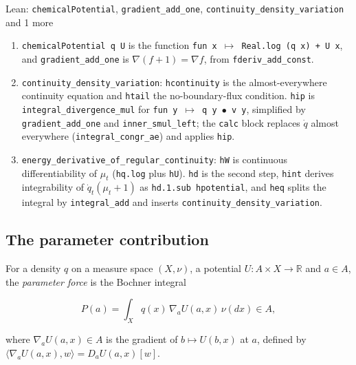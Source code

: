 \documentclass[11pt,a4paper]{report}
\begin{document}
\begin{leanbox}{Lean: \texttt{chemicalPotential}, \texttt{gradient\_\allowbreak{}add\_\allowbreak{}one}, \texttt{continuity\_\allowbreak{}density\_\allowbreak{}variation} and 1 more}
\begin{enumerate}
\item \texttt{chemical\allowbreak{}Potential q U} is the function \texttt{fun x \ensuremath{\mapsto} Real.\allowbreak{}log (q x) + U x}, and \texttt{gradient\_\allowbreak{}add\_\allowbreak{}one} is \(\nabla(f+1)=\nabla f\), from \texttt{fderiv\_\allowbreak{}add\_\allowbreak{}const}.

\item \texttt{continuity\_\allowbreak{}density\_\allowbreak{}variation}: \texttt{hcontinuity} is the almost-everywhere continuity equation and \texttt{htail} the no-boundary-flux condition. \texttt{hip} is \texttt{integral\_\allowbreak{}divergence\_\allowbreak{}mul} for \texttt{fun y \ensuremath{\mapsto} q y \ensuremath{\bullet} v y}, simplified by \texttt{gradient\_\allowbreak{}add\_\allowbreak{}one} and \texttt{inner\_\allowbreak{}smul\_\allowbreak{}left}; the \texttt{calc} block replaces \(\dot q\) almost everywhere (\texttt{integral\_\allowbreak{}congr\_\allowbreak{}ae}) and applies \texttt{hip}.

\item \texttt{energy\_\allowbreak{}derivative\_\allowbreak{}of\_\allowbreak{}regular\_\allowbreak{}continuity}: \texttt{h\allowbreak{}W} is continuous differentiability of \(\mu_t\) (\texttt{hq.\allowbreak{}log} plus \texttt{h\allowbreak{}U}). \texttt{hd} is the second step, \texttt{hint} derives integrability of \(\dot q_t(\mu_t+1)\) as \texttt{hd.\allowbreak{}1.\allowbreak{}sub hpotential}, and \texttt{heq} splits the integral by \texttt{integral\_\allowbreak{}add} and inserts \texttt{continuity\_\allowbreak{}density\_\allowbreak{}variation}.

\end{enumerate}
\end{leanbox}
\subsection{\texorpdfstring{The parameter contribution}{The parameter contribution}}


For a density \(q\) on a measure space \((X,\nu)\), a potential \(U:A\times X\to\mathbb R\) and \(a\in A\), the \emph{parameter force} is the Bochner integral


\[P(a)=\int_Xq(x)\,\nabla_aU(a,x)\,\nu(dx)\in A,\]


where \(\nabla_aU(a,x)\in A\) is the gradient of \(b\mapsto U(b,x)\) at \(a\), defined by \(\langle\nabla_aU(a,x),w\rangle=D_aU(a,x)[w]\).
\end{document}
